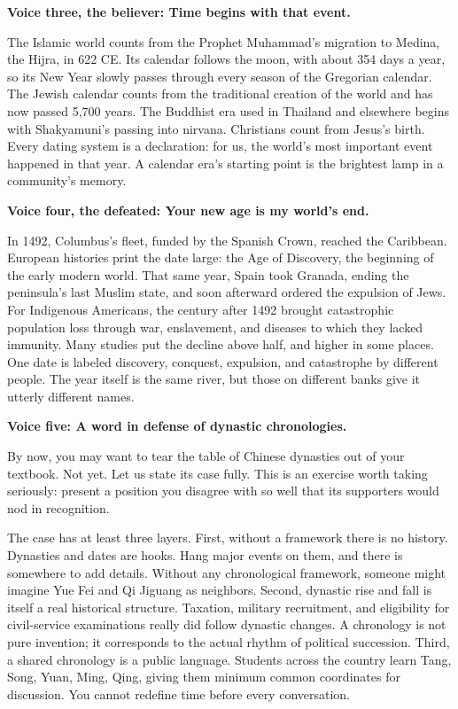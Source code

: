 \textbf{Voice three, the believer: Time begins with that event.}

The Islamic world counts from the Prophet Muhammad's migration to Medina, the Hijra, in 622 CE. Its calendar follows the moon, with about 354 days a year, so its New Year slowly passes through every season of the Gregorian calendar. The Jewish calendar counts from the traditional creation of the world and has now passed 5,700 years. The Buddhist era used in Thailand and elsewhere begins with Shakyamuni's passing into nirvana. Christians count from Jesus's birth. Every dating system is a declaration: for us, the world's most important event happened in that year. A calendar era's starting point is the brightest lamp in a community's memory.

\textbf{Voice four, the defeated: Your new age is my world's end.}

In 1492, Columbus's fleet, funded by the Spanish Crown, reached the Caribbean. European histories print the date large: the Age of Discovery, the beginning of the early modern world. That same year, Spain took Granada, ending the peninsula's last Muslim state, and soon afterward ordered the expulsion of Jews. For Indigenous Americans, the century after 1492 brought catastrophic population loss through war, enslavement, and diseases to which they lacked immunity. Many studies put the decline above half, and higher in some places. One date is labeled discovery, conquest, expulsion, and catastrophe by different people. The year itself is the same river, but those on different banks give it utterly different names.

\textbf{Voice five: A word in defense of dynastic chronologies.}

By now, you may want to tear the table of Chinese dynasties out of your textbook. Not yet. Let us state its case fully. This is an exercise worth taking seriously: present a position you disagree with so well that its supporters would nod in recognition.

The case has at least three layers. First, without a framework there is no history. Dynasties and dates are hooks. Hang major events on them, and there is somewhere to add details. Without any chronological framework, someone might imagine Yue Fei and Qi Jiguang as neighbors. Second, dynastic rise and fall is itself a real historical structure. Taxation, military recruitment, and eligibility for civil-service examinations really did follow dynastic changes. A chronology is not pure invention; it corresponds to the actual rhythm of political succession. Third, a shared chronology is a public language. Students across the country learn Tang, Song, Yuan, Ming, Qing, giving them minimum common coordinates for discussion. You cannot redefine time before every conversation.


